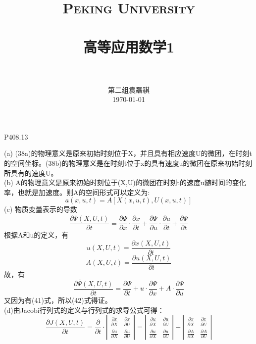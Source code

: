 \documentclass[12pt]{article}
\title{
		\vspace{-1in} 	
		\usefont{OT1}{bch}{b}{n}
		\normalfont \normalsize \textsc{\LARGE Peking University}\\[1cm] %
		\horrule{0.5pt} \\[0.5cm]
		\huge \bfseries{高等应用数学1} \\
		\horrule{2pt} \\[0.5cm]
}
\author{
		\normalfont 								\normalsize
		第二组\quad 袁磊祺\\	\normalsize
        \today
}
\date{}
\begin{document}
% 

\maketitle

\section{}

P408.13

(a) (38a)的物理意义是原来初始时刻位于X，并且具有相应速度U的微团，在时刻t的空间坐标。(38b)的物理意义是在时刻t位于x的具有速度u的微团在原来初始时刻所具有的速度U。
\\(b) A的物理意义是原来初始时刻位于(X,U)的微团在时刻t的速度u随时间的变化率，也就是加速度。则A的空间形式可以定义为:
\begin{equation}
	a(x,u,t)=A[X(x,u,t), U(x,u,t)]
\end{equation}
(c) 物质变量表示的导数
\begin{equation}
	\frac{\partial\overline\Psi(X,U,t)}{\partial t} = \frac{\partial\Psi}{\partial x}\cdot\frac{\partial x}{\partial t} + \frac{\partial\Psi}{\partial u}\cdot\frac{\partial u}{\partial t} + \frac{\partial\Psi}{\partial t}
\end{equation}
根据A和u的定义，有
$$u(X,U,t) = \frac{\partial x(X,U,t)}{\partial t}$$
$$A(X,U,t) = \frac{\partial u(X,U,t)}{\partial t}$$
故，有
$$\frac{\partial\overline\Psi(X,U,t)}{\partial t} =
\frac{\partial\Psi}{\partial t} + u\cdot\frac{\partial\Psi}{\partial x} + A\cdot\frac{\partial\Psi}{\partial u}$$
又因为有(41)式，所以(42)式得证。
\\(d)由Jacobi行列式的定义与行列式的求导公式可得：
$$\frac{\partial J(X,U,t)}{\partial t} =\frac{\partial}{\partial t}\cdot
{\left|
	\begin{array}{ccc}
    	\frac{\partial x}{\partial X} & \frac{\partial x}{\partial U}\\
    	\frac{\partial u}{\partial X} & \frac{\partial u}{\partial U}
	\end{array} 	
\right |} = 
{\left|
	\begin{array}{ccc}
		\frac{\partial u}{\partial X} & \frac{\partial u}{\partial U}\\
		\frac{\partial u}{\partial X} & \frac{\partial u}{\partial U}
	\end{array} 	
\right |} + 
{\left|
	\begin{array}{ccc}
		\frac{\partial x}{\partial X} & \frac{\partial x}{\partial U}\\
		\frac{\partial A}{\partial X} & \frac{\partial A}{\partial U}
	\end{array} 	
	\right |}
$$
\end{document}
